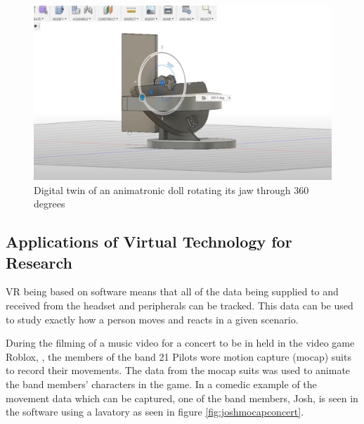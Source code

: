 \documentclass[12pt]{article}
\begin{document}
\begin{figure}[h]
  \centering
  \begin{minipage}[b]{0.9\linewidth}
    \includegraphics[width=\linewidth]{images/michael reeves.png}
    \caption{Digital twin of an animatronic doll rotating its jaw through 360 degrees}
    \label{fig:michaelreeves}
  \end{minipage}
\end{figure}

\subsection{Applications of Virtual Technology for Research}

VR being based on software means that all of the data being supplied to and received from the headset and peripherals can be tracked. This data can be used to study exactly how a person moves and reacts in a given scenario. \cite{baldominos2015approach}

During the filming of a music video for a concert to be in held in the video game Roblox, \cite{Roblox}, the members of the band 21 Pilots wore motion capture (mocap) suits to record their movements. The data from the mocap suits was used to animate the band members' characters in the game. \cite{YouTubeVideo21Pilots} In a comedic example of the movement data which can be captured, one of the band members, Josh, is seen in the software using a lavatory \cite{RedditPost21Pilots} as seen in figure \ref{fig:joshmocapconcert}.
\end{document}
